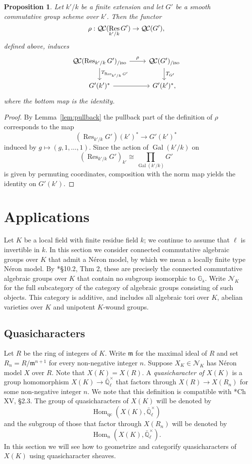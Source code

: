 \documentclass[10pt]{amsart}
\theoremstyle{plain}
\newtheorem{proposition}[theorem]{Proposition}
\theoremstyle{definition}
\theoremstyle{remark}
\newcommand{\EE}{\mathbb{\bar Q}_\ell}
\newcommand{\Fq}{k}
\newcommand{\EEx}{\EE^\times}
\newcommand{\m}{{\mathfrak{m}}}
\DeclareMathOperator{\Gal}{Gal}
\DeclareMathOperator{\Hom}{Hom}
\DeclareMathOperator{\Res}{Res}
\newcommand{\TrFrob}[1]{T_{#1}}
\newcommand{\QC}{{\mathcal{Q\hskip-0.8pt C}}}
\newcommand{\QCiso}[1]{\QC(#1)_{/\text{iso}}}
\begin{document}
\begin{proposition}
Let $k'/k$ be a finite extension and let $G'$ be a smooth commutative group scheme over $k'$.
Then the functor 
\[
\rho : \QC(\Res_{k'/k}G') \to \QC(G'),
\]
defined above, induces
\[
\begin{tikzcd}
\QCiso{\Res_{k'/k} G'} \dar{\TrFrob{\Res_{k'/k} G'}} \rar{\rho} & \QCiso{G'} \dar{\TrFrob{G'}}\\
G'(k')^* \rar & G'(k')^*,
\end{tikzcd}
\]
where the bottom map is the identity.
\end{proposition}
\begin{proof}
By Lemma~\ref{lem:pullback} the pullback part of the definition of $\rho$ corresponds to the map
\[
(\Res_{k'/k}G')(k')^* \to G'(k')^*
\]
induced by $g \mapsto (g, 1, \ldots, 1)$.  Since the action of $\Gal(k'/k)$ on
\[
(\Res_{k'/k}G')_{k'} \cong \prod_{\Gal(k'/k)} G'
\]
is given by permuting coordinates, composition with the norm map yields the identity on $G'(k')$.
\end{proof}


\section{Applications}\label{sec:applications}

Let $K$ be a local field with finite residue field $\Fq$;
 we continue to assume that $\ell$ is invertible in $\Fq$.
In this section we consider connected commutative algebraic groups over $K$ that admit a N\'eron model, by which we mean a locally finite type N\'eron model.
By \cite{bosch-lutkebohmert-reynaud:NeronModels}*{\S 10.2, Thm 2}, these are precisely the connected commutative algebraic groups over $K$ that contain no subgroup isomorphic to $\mathbb{G}_\text{a}$.
Write $\mathcal{N}_K$ for the full subcategory of the category of algebraic groups consisting of such objects.  This category is additive, and includes all algebraic tori over $K$, abelian varieties over $K$ and unipotent $K$-wound groups.

\subsection{Quasicharacters}\label{ssec:quasicharacters}

Let $R$ be the ring of integers of $K$.
Write $\m$ for the maximal ideal of $R$ and set $R_n = R/\m^{n+1}$ for every non-negative integer $n$.
Suppose $X_K \in \mathcal{N}_K$ has N\'eron model $X$ over $R$.
Note that $X(K) = X(R)$.
A \emph{quasicharacter of $X(K)$} is a group homomorphism $X(K) \to \EEx$ that factors through $X(R) \to X(R_n)$ for some non-negative integer $n$.
We note that this definition is compatible with \cite{cassels-frohlich:AlgebraicNumberTheory}*{Ch XV, \S 2.3}.
The group of quasicharacters of $X(K)$ will be denoted by 
\[
\Hom_\text{qc}(X(K),\EEx)
\]
 and the subgroup of those that factor through $X(R_n)$ will be denoted by 
 \[
 \Hom_n(X(K),\EEx).
\]
In this section we will see how to geometrize and categorify quasicharacters of $X(K)$ using quasicharacter sheaves.
\end{document}
